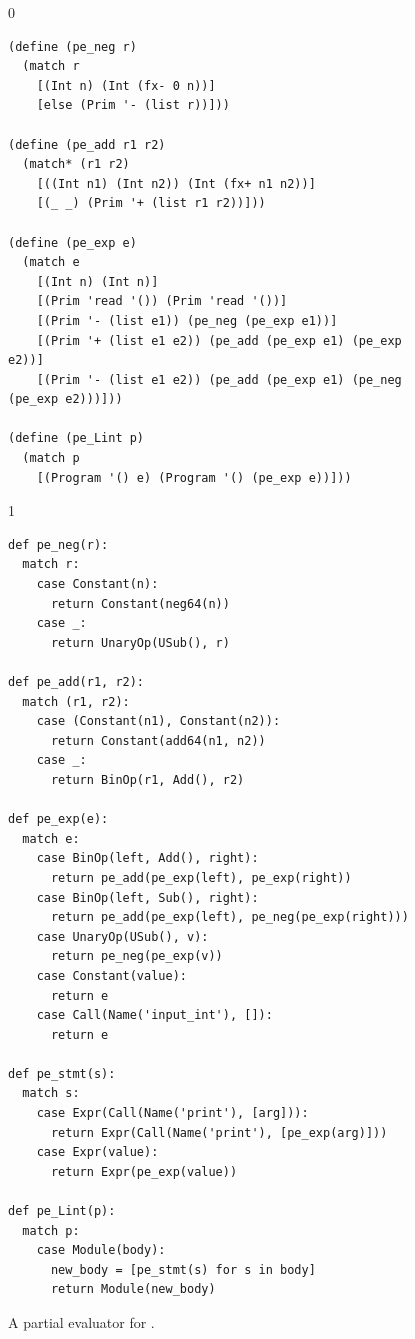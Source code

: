 \documentclass[7x10]{TimesAPriori_MIT}%
\def\racketEd{0}
\def\pythonEd{1}
\def\edition{1}
\newcommand{\pythonColor}[0]{}
\numberwithin{theorem}{chapter}
\numberwithin{definition}{chapter}
\numberwithin{equation}{chapter}
\begin{document}
\begin{figure}[tp]
  \begin{tcolorbox}[colback=white]
    {\if\edition\racketEd
\begin{lstlisting}
(define (pe_neg r)
  (match r
    [(Int n) (Int (fx- 0 n))]
    [else (Prim '- (list r))]))

(define (pe_add r1 r2)
  (match* (r1 r2)
    [((Int n1) (Int n2)) (Int (fx+ n1 n2))]
    [(_ _) (Prim '+ (list r1 r2))]))

(define (pe_exp e)
  (match e
    [(Int n) (Int n)]
    [(Prim 'read '()) (Prim 'read '())]
    [(Prim '- (list e1)) (pe_neg (pe_exp e1))]
    [(Prim '+ (list e1 e2)) (pe_add (pe_exp e1) (pe_exp e2))]
    [(Prim '- (list e1 e2)) (pe_add (pe_exp e1) (pe_neg (pe_exp e2)))]))

(define (pe_Lint p)
  (match p
    [(Program '() e) (Program '() (pe_exp e))]))
\end{lstlisting}
\fi}
{\if\edition\pythonEd\pythonColor
\begin{lstlisting}
def pe_neg(r):
  match r:
    case Constant(n):
      return Constant(neg64(n))
    case _:
      return UnaryOp(USub(), r)
  
def pe_add(r1, r2):
  match (r1, r2):
    case (Constant(n1), Constant(n2)):
      return Constant(add64(n1, n2))
    case _:
      return BinOp(r1, Add(), r2)

def pe_exp(e):
  match e:
    case BinOp(left, Add(), right):
      return pe_add(pe_exp(left), pe_exp(right))
    case BinOp(left, Sub(), right):
      return pe_add(pe_exp(left), pe_neg(pe_exp(right)))
    case UnaryOp(USub(), v):
      return pe_neg(pe_exp(v))
    case Constant(value):
      return e
    case Call(Name('input_int'), []):
      return e            

def pe_stmt(s):
  match s:
    case Expr(Call(Name('print'), [arg])):
      return Expr(Call(Name('print'), [pe_exp(arg)]))
    case Expr(value):
      return Expr(pe_exp(value))

def pe_Lint(p):
  match p:
    case Module(body):
      new_body = [pe_stmt(s) for s in body]
      return Module(new_body)
\end{lstlisting}
\fi}
\end{tcolorbox}
\caption{A partial evaluator for \LangInt{}.}
\label{fig:pe-arith}
\end{figure}
\end{document}

